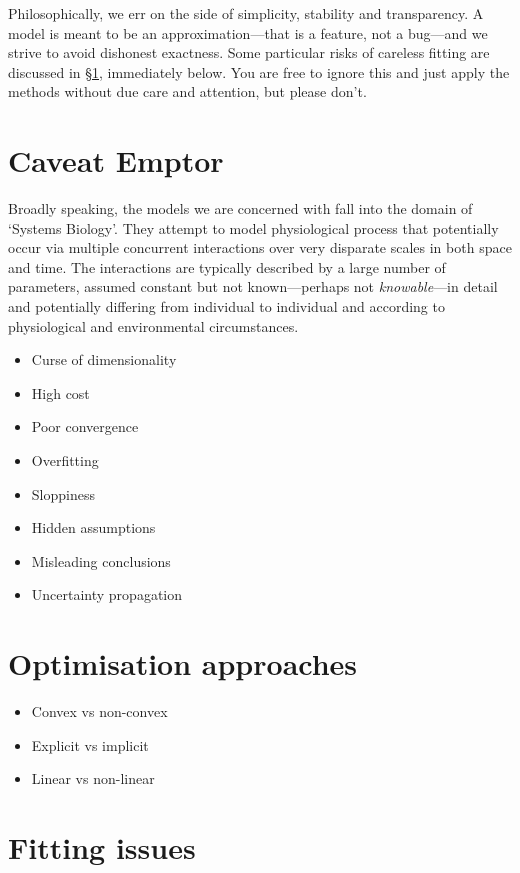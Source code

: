 \documentclass[a4paper,11pt]{article}
\begin{document}
Philosophically, we err on the side of simplicity, stability and transparency. A model is meant to be an approximation---that is a feature, not a bug---and we strive to avoid dishonest exactness. Some particular risks of careless fitting are discussed in \S\ref{caveat}, immediately below. You are free to ignore this and just apply the methods without due care and attention, but please don't.

\section{Caveat Emptor}\label{caveat}

Broadly speaking, the models we are concerned with fall into the domain of `Systems Biology'. They attempt to model physiological process that potentially occur via multiple concurrent interactions over very disparate scales in both space and time. The interactions are typically described by a large number of parameters, assumed constant but not known---perhaps not \textit{knowable}---in detail and potentially differing from individual to individual and according to physiological and environmental circumstances.

\begin{itemize}
\item Curse of dimensionality
\item High cost
\item Poor convergence
\item Overfitting
\item Sloppiness
\item Hidden assumptions
\item Misleading conclusions
\item Uncertainty propagation
\end{itemize}

\section{Optimisation approaches}\label{optim}

\begin{itemize}
\item Convex vs non-convex
\item Explicit vs implicit
\item Linear vs non-linear
\end{itemize}

\section{Fitting issues}\label{fitting}
\end{document}
